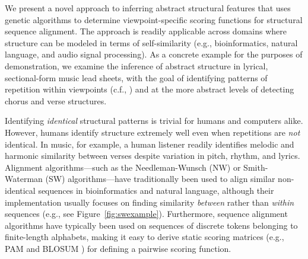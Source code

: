 \documentclass[phd,electronic,oneside,twosidetoc,letterpaper,chaptercenter,parttop,lol,lof,lot]{byumsphd}
\begin{document}
We present a novel approach to inferring abstract structural features that uses genetic algorithms to determine viewpoint-specific scoring functions for structural sequence alignment. The approach is readily applicable across domains where structure can be modeled in terms of self-similarity (e.g., bioinformatics, natural language, and audio signal processing). As a concrete example for the purposes of demonstration, we examine the inference of abstract structure in lyrical, sectional-form music lead sheets, with the goal of identifying patterns of repetition within viewpoints (c.f., \cite{conklin1995multiple}) and at the more abstract levels of detecting chorus and verse structures.

Identifying \textit{identical} structural patterns is trivial for humans and computers alike. However, humans identify structure extremely well even when repetitions are \textit{not} identical. In music, for example, a human listener readily identifies melodic and harmonic similarity between verses despite variation in pitch, rhythm, and lyrics. Alignment algorithms---such as the Needleman-Wunsch (NW) \cite{needleman1970general} or Smith-Waterman (SW) \cite{smith1981identification} algorithms---have traditionally been used to align similar non-identical sequences in bioinformatics and natural language, although their implementation usually focuses on finding similarity \textit{between} rather than \textit{within} sequences (e.g., see Figure~\ref{fig:swexample}). Furthermore, sequence alignment algorithms have typically been used on sequences of discrete tokens belonging to finite-length alphabets, making it easy to derive static scoring matrices (e.g., PAM \cite{dayhoff197822} and BLOSUM \cite{henikoff1992amino}) for defining a pairwise scoring function.
\end{document}
